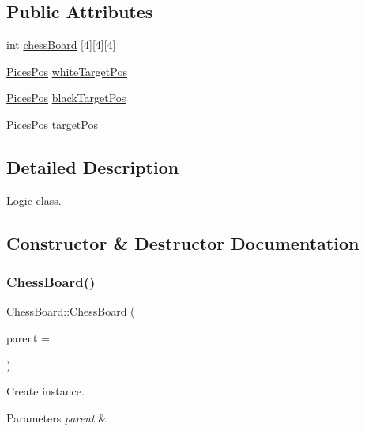 \subsection*{Public Attributes}
\begin{DoxyCompactItemize}
\item 
int \hyperlink{class_chess_board_ab58be444056dbb531b3b2535b4054b54}{chess\+Board} \mbox{[}4\mbox{]}\mbox{[}4\mbox{]}\mbox{[}4\mbox{]}
\item 
\hyperlink{struct_pices_pos}{Pices\+Pos} \hyperlink{class_chess_board_aa03bcc987457e608a908809663085302}{white\+Target\+Pos}
\item 
\hyperlink{struct_pices_pos}{Pices\+Pos} \hyperlink{class_chess_board_a5d8e4b1cbd87ef1dd7bac6de42e375ff}{black\+Target\+Pos}
\item 
\hyperlink{struct_pices_pos}{Pices\+Pos} \hyperlink{class_chess_board_af130ebe77300106c1a79a8fd54600cd2}{target\+Pos}
\end{DoxyCompactItemize}


\subsection{Detailed Description}
Logic class. 

\subsection{Constructor \& Destructor Documentation}
\mbox{\label{class_chess_board_aaf5e38879e16f626b94f42cb2cb2a9f2}} 
\subsubsection{\texorpdfstring{Chess\+Board()}{ChessBoard()}}
{\footnotesize\ttfamily Chess\+Board\+::\+Chess\+Board (\begin{DoxyParamCaption}\item[{Q\+Object $\ast$}]{parent = {} }\end{DoxyParamCaption})\hspace{0.3cm}{\ttfamily [explicit]}}



Create instance. 


\begin{DoxyParams}{Parameters}
{\em parent} & \\
\hline
\end{DoxyParams}


